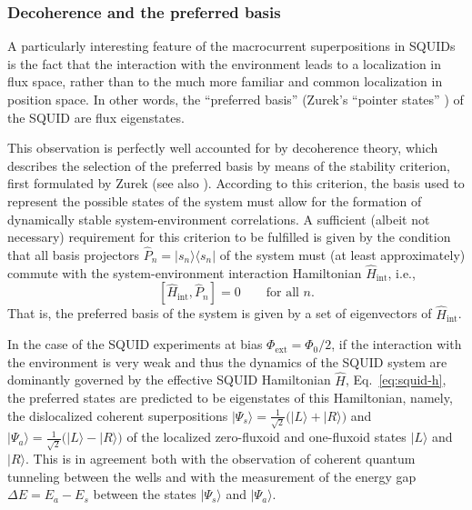 \documentclass[12pt,aps,floatfix,amsmath,amssymb,showpacs,nofootinbib]{revtex4-2}
\newcommand{\be}{\begin{equation}} \newcommand{\ee}{\end{equation}}
\newcommand{\ket}[1]{\ensuremath{|{#1\rangle}}}
\newcommand{\ketbra}[2]{\ensuremath{|{#1 \rangle}{\langle #2}|}}
\begin{document}
\subsubsection{Decoherence and the preferred basis} \label{sec:squid-prefbasis}

A particularly interesting feature of the macrocurrent superpositions
in SQUIDs is the fact that the interaction with the environment leads
to a localization in flux space, rather than to the much more familiar
and common localization in position space. In other words, the
``preferred basis'' (Zurek's ``pointer states''
\cite{Zurek:1981:dd,Zurek:1982:tv}) of the SQUID are flux eigenstates.

This observation is perfectly well accounted for by decoherence
theory, which describes the selection of the preferred basis by means
of the stability criterion, first formulated by Zurek
\cite{Zurek:1981:dd} (see also
\cite{Zurek:1982:tv,Zurek:1993:pu,Zurek:1998:re,Zurek:2002:ii,Schlosshauer:2003:tv}).
According to this criterion, the basis used to represent the possible
states of the system must allow for the formation of dynamically
stable system-environment correlations.  A sufficient (albeit not
necessary) requirement for this criterion to be fulfilled is given by
the condition that all basis projectors $\widehat{P}_n =
\ketbra{s_n}{s_n}$ of the system must (at least approximately) commute
with the system-environment interaction Hamiltonian
$\widehat{H}_\text{int}$, i.e.,
%
\be \label{eq:commut}
[\widehat{H}_\text{int}, \widehat{P}_n] = 0 \qquad \text{for all $n$.}
\ee
%
That is, the preferred basis of the system is given by a set of
eigenvectors of $\widehat{H}_\text{int}$.
  
In the case of the SQUID experiments at bias $\Phi_\text{ext} =
\Phi_0/2$, if the interaction with the environment is very weak and thus
the dynamics of the SQUID system are dominantly governed by the
effective SQUID Hamiltonian $\widehat{H}$, Eq.~\eqref{eq:squid-h}, the
preferred states are predicted to be eigenstates of this Hamiltonian,
namely, the dislocalized coherent superpositions $\ket{\Psi_s} =
\frac{1}{\sqrt{2}} \bigl( \ket{L} + \ket{R} \bigr)$ and $\ket{\Psi_a}
= \frac{1}{\sqrt{2}} \bigl( \ket{L} - \ket{R} \bigr)$ of the localized
zero-fluxoid and one-fluxoid states $\ket{L}$ and $\ket{R}$. This is
in agreement both with the observation of coherent quantum tunneling
between the wells and with the measurement of the energy gap $\Delta E
= E_a - E_s$ between the states $\ket{\Psi_s}$ and $\ket{\Psi_a}$.
\end{document}
